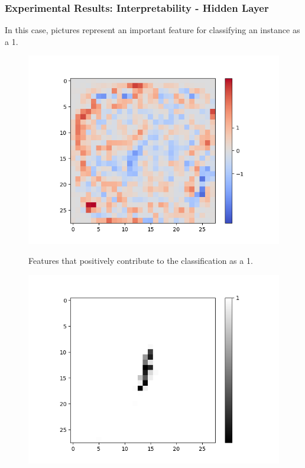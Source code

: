 \documentclass[]{beamer}
\begin{document}
\begin{frame}
\frametitle{Experimental Results: Interpretability - Hidden Layer}
In this case, pictures represent an important feature for classifying an instance as a 1.

\noindent
\begin{minipage}[t]{0.4\textwidth}
	\begin{figure}[H]
		\centering
		\begin{minipage}[b]{0.7\textwidth}
			\captionsetup{labelformat=empty}
			\includegraphics[width=\textwidth]{Images/Sigmoid(Hidden-Layer)/Like/Layer0-Neuron-11.png}
			\label{}
		\end{minipage}
		\caption{Features that positively contribute to the classification as a 1.}
		\hfill
	\end{figure}
\end{minipage}
\hspace{0.1\textwidth}
\begin{minipage}[t]{0.4\textwidth}
\begin{figure}[H]
		\centering
		\begin{minipage}[b]{0.7\textwidth}
			\captionsetup{labelformat=empty}
			\includegraphics[width=\textwidth]{Images/AND-OR(W-LSM)(1)/Like/True/Layer0-Neuron-9.png}
			\label{}
		\end{minipage}
		

\end{figure}
\end{minipage}
\end{frame}
\end{document}
